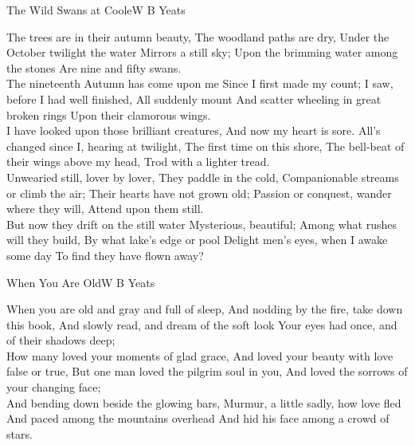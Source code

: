 \begin{poem}{The Wild Swans at Coole}{W B Yeats}

The trees are in their autumn beauty, 
The woodland paths are dry, 
Under the October twilight the water 
Mirrors a still sky; 
Upon the brimming water among the stones 
Are nine and fifty swans. \\

The nineteenth Autumn has come upon me 
Since I first made my count; 
I saw, before I had well finished, 
All suddenly mount 
And scatter wheeling in great broken rings 
Upon their clamorous wings. \\

I have looked upon those brilliant creatures, 
And now my heart is sore. 
All's changed since I, hearing at twilight, 
The first time on this shore, 
The bell-beat of their wings above my head, 
Trod with a lighter tread. \\

Unwearied still, lover by lover, 
They paddle in the cold, 
Companionable streams or climb the air; 
Their hearts have not grown old; 
Passion or conquest, wander where they will, 
Attend upon them still. \\

But now they drift on the still water 
Mysterious, beautiful; 
Among what rushes will they build, 
By what lake's edge or pool 
Delight men's eyes, when I awake some day 
To find they have flown away?\\
\end{poem}

 

\begin{poem}{When You Are Old}{W B Yeats}

When you are old and gray and full of sleep, 
And nodding by the fire, take down this book, 
And slowly read, and dream of the soft look 
Your eyes had once, and of their shadows deep; \\

How many loved your moments of glad grace, 
And loved your beauty with love false or true, 
But one man loved the pilgrim soul in you, 
And loved the sorrows of your changing face; \\

And bending down beside the glowing bars, 
Murmur, a little sadly, how love fled 
And paced among the mountains overhead 
And hid his face among a crowd of stars. \\
\end{poem}


